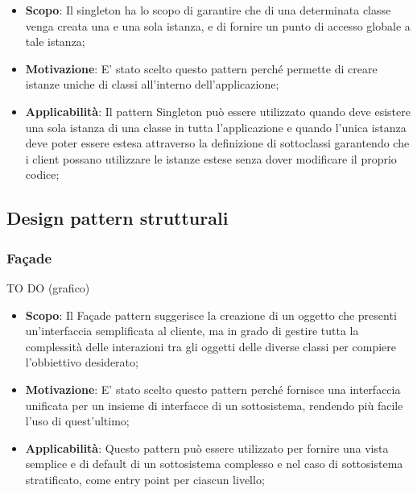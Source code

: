 		\begin{itemize}
			\item \textbf{Scopo}: Il singleton ha lo scopo di garantire che di una determinata classe venga creata una e una sola istanza, e di fornire un punto di accesso globale a tale istanza;

			\item \textbf{Motivazione}: E' stato scelto questo pattern perché permette di creare istanze uniche di classi all'interno dell'applicazione;

			\item \textbf{Applicabilità}: Il pattern Singleton può essere utilizzato quando deve esistere una sola istanza di una classe in tutta l'applicazione e quando l'unica istanza deve poter essere estesa attraverso la definizione di sottoclassi garantendo che i client possano utilizzare le istanze estese senza dover modificare il proprio codice;
		\end{itemize}




	\clearpage
	\newpage
	\subsection{Design pattern strutturali} %
		\subsubsection{Fa\c{c}ade} %
		TO DO (grafico)

		\begin{itemize}
			\item \textbf{Scopo}: Il Fa\c{c}ade pattern suggerisce la creazione di un oggetto che presenti un'interfaccia semplificata al cliente, ma in grado di gestire tutta la complessità delle interazioni tra gli oggetti delle diverse classi per compiere l'obbiettivo desiderato;

			\item \textbf{Motivazione}: E' stato scelto questo pattern perché fornisce una interfaccia unificata per un insieme di interfacce di un sottosistema, rendendo più facile l'uso di quest'ultimo;

			\item \textbf{Applicabilità}: Questo pattern può essere utilizzato per fornire una vista semplice e di default di un sottosistema complesso e nel caso di sottosistema stratificato, come entry point per ciascun livello;

		\end{itemize}



